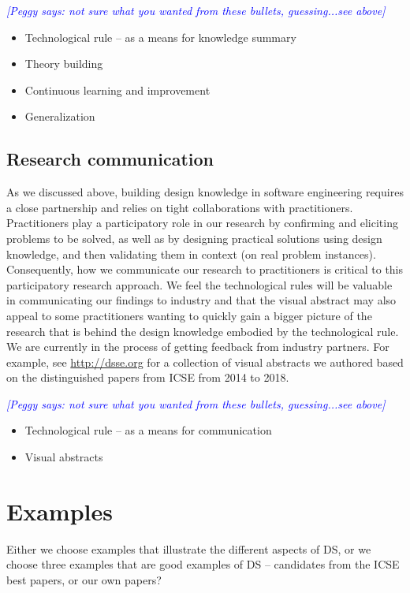 \documentclass[graybox]{svmult}
\newcommand{\peggy}[1]{\textcolor{blue}{{\it [Peggy says: #1]}}}
\newcommand{\peggy}[1]{}
\begin{document}
\peggy{ not sure what you wanted from these bullets, guessing...see above}
\begin{itemize}
\item Technological rule -- as a means for knowledge summary
\item Theory building
\item Continuous learning and improvement
\item Generalization
\end{itemize}

\subsection{Research communication}
\label{sec:communication}

As we discussed above, building design knowledge in software engineering requires a close partnership and relies on tight collaborations with practitioners. 
Practitioners play a participatory role in our research by confirming and eliciting problems to be solved, as well as by designing practical solutions using design knowledge, and then validating them in context (on real problem instances). 
Consequently, how we communicate our research to practitioners is critical to this participatory research approach. 
We feel the technological rules will be valuable in communicating our findings to industry and that the visual abstract may also appeal to some practitioners wanting to quickly gain a bigger picture of the research that is behind the design knowledge embodied by the technological rule. 
We are currently in the process of getting feedback from industry partners.  For example, see \url{http://dsse.org} for a collection of visual abstracts we authored based on the distinguished papers from ICSE from 2014 to 2018.  

\peggy{ not sure what you wanted from these bullets, guessing...see above}
\begin{itemize}
\item Technological rule -- as a means for communication
\item Visual abstracts
\end{itemize}


\section{Examples}
Either we choose examples that illustrate the different aspects of DS, or we choose three examples that are good examples of DS -- candidates from the ICSE best papers, or our own papers?
\end{document}
